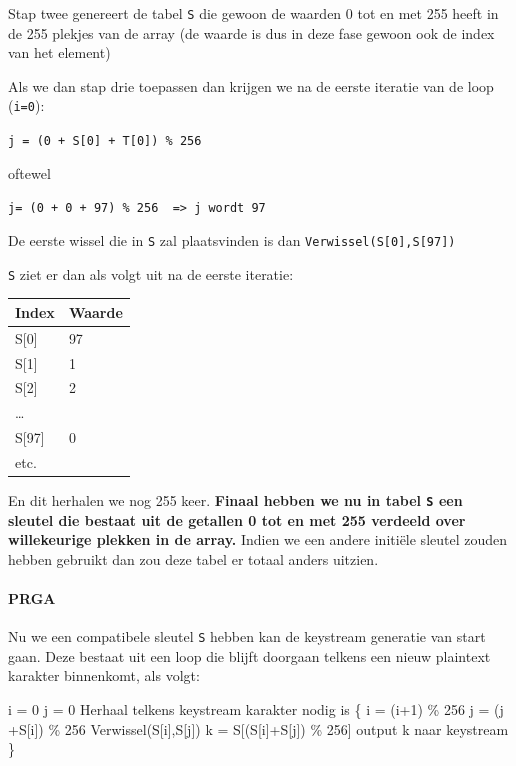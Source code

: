\documentclass[
  10pt,
  dutch,
  paper=a4,
  ,captions=tableheading
]{scrbook}
\newenvironment{Shaded}{}{}
\newcommand{\NormalTok}[1]{#1}
\begin{document}
Stap twee genereert de tabel \texttt{S} die gewoon de waarden 0 tot en
met 255 heeft in de 255 plekjes van de array (de waarde is dus in deze
fase gewoon ook de index van het element)

Als we dan stap drie toepassen dan krijgen we na de eerste iteratie van
de loop (\texttt{i=0}):

\texttt{j\ =\ (0\ +\ S{[}0{]}\ +\ T{[}0{]})\ \%\ 256}

oftewel

\texttt{j=\ (0\ +\ 0\ +\ 97)\ \%\ 256\ \ =\textgreater{}\ j\ wordt\ 97}

De eerste wissel die in \texttt{S} zal plaatsvinden is dan
\texttt{Verwissel(S{[}0{]},S{[}97{]})}

\texttt{S} ziet er dan als volgt uit na de eerste iteratie:

{\def\LTcaptype{none} %
\begin{longtable}[]{@{}ll@{}}
\toprule\noalign{}
Index & Waarde \\
\midrule\noalign{}
\endhead
\bottomrule\noalign{}
\endlastfoot
S{[}0{]} & 97 \\
S{[}1{]} & 1 \\
S{[}2{]} & 2 \\
\ldots{} & \\
S{[}97{]} & 0 \\
etc. & \\
\end{longtable}
}

En dit herhalen we nog 255 keer. \textbf{Finaal hebben we nu in tabel
\texttt{S} een sleutel die bestaat uit de getallen 0 tot en met 255
verdeeld over willekeurige plekken in de array.} Indien we een andere
initiële sleutel zouden hebben gebruikt dan zou deze tabel er totaal
anders uitzien.

\paragraph{PRGA}\label{prga}

Nu we een compatibele sleutel \texttt{S} hebben kan de keystream
generatie van start gaan. Deze bestaat uit een loop die blijft doorgaan
telkens een nieuw plaintext karakter binnenkomt, als volgt:

\begin{Shaded}
\begin{Highlighting}[]
\NormalTok{i = 0}
\NormalTok{j = 0}
\NormalTok{Herhaal telkens keystream karakter nodig is}
\NormalTok{\{}
\NormalTok{  i = (i+1) \% 256}
\NormalTok{  j = (j +S[i]) \% 256}
\NormalTok{  Verwissel(S[i],S[j])}
\NormalTok{  k = S[(S[i]+S[j]) \% 256]}
\NormalTok{  output k naar keystream}
\NormalTok{\}}
\end{Highlighting}
\end{Shaded}
\end{document}
